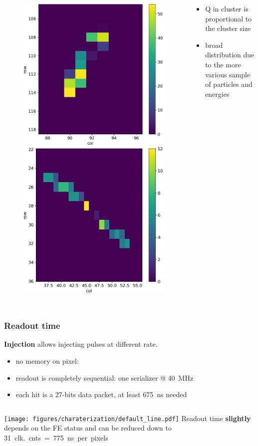 \begin{frame}
\begin{columns}
\begin{figure}
                    \includegraphics[width=.3\linewidth]{figures/charaterization/evts/cosmic_rays/12.png} 
                    \includegraphics[width=.3\linewidth]{figures/charaterization/evts/cosmic_rays/19a.png}
                \end{figure}

                \begin{itemize}
                    \item Q in cluster is proportional to the cluster size
                    \item broad distribution due to the more various sample of particles and energies
                \end{itemize}
        \end{columns}
    \end{frame}    


    \begin{frame}
        \frametitle{Readout time}
        \textbf{Injection} allows injecting pulses at different rate. 
        \begin{itemize}
            \item no memory on pixel: 
            \item readout is completely sequential: one serializer @ \SI{40}{MHz}
            \item each hit is a 27-bits data packet, at least \SI{675}{ns} needed
        \end{itemize}

        \medskip
        \begin{columns}
                \texttt{[image: figures/charaterization/default\_line.pdf]}
            Readout time \textbf{slightly} depends on the FE status and can be reduced down to \SI{31}{clk.}cnts = \SI{775}{ns} per pixels 

        \end{columns}            
    \end{frame}          